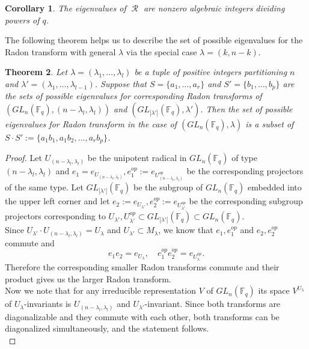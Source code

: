\documentclass[12pt,reqno]{amsart}
\newtheorem{thm}{Theorem}[section]
\newtheorem{cor}[thm]{Corollary}
\theoremstyle{definition}
\theoremstyle{remark}
\numberwithin{equation}{section}
\DeclareMathOperator{\R}{\mathcal{R}}
\begin{document}
\begin{cor}
    The eigenvalues of $\R$ are nonzero algebraic integers dividing powers of $q$.
\end{cor}

The following theorem helps us to describe the set of possible eigenvalues for the Radon transform with general $\lambda$ via the special case $\lambda=(k,n-k)$.\\

\begin{thm}\label{eigenvalues_box}
    Let $\lambda=(\lambda_1,\dots,\lambda_l)$ be a tuple of positive integers partitioning $n$ and $\lambda'=(\lambda_1,\dots,\lambda_{l-1})$. Suppose that $S=\{a_1,\dots, a_r\}$ and $S'=\{b_1,\dots, b_p\}$ are the sets of possible eigenvalues for corresponding Radon transforms of $(GL_{n}(\mathbb{F}_q),(n-\lambda_l,\lambda_l))$ and $(GL_{|\lambda'|}(\mathbb{F}_q), \lambda')$. Then the set of possible eigenvalues for Radon transform in the case of $(GL_{n}(\mathbb{F}_q),\lambda)$ is a subset of $S\cdot S':=\{a_1b_1, a_1b_2,\dots, a_rb_p\}$.
\end{thm}

\begin{proof}
    Let $U_{(n-\lambda_l,\lambda_l)}$ be the unipotent radical in $GL_{n}(\mathbb{F}_q)$ of type $(n-\lambda_l,\lambda_l)$ and $e_1=e_{U_{(n-\lambda_l,\lambda_l)}},e_1^{op}:=e_{U_{(n-\lambda_l,\lambda_l)}^{op}}$ be the corresponding projectors of the same type. Let $GL_{|\lambda'|}(\mathbb{F}_q)$ be the subgroup of $GL_n(\mathbb{F}_q)$ embedded into the upper left corner and let $e_2:=e_{U_{\lambda'}},e_2^{op}:=e_{U_{\lambda'}^{op}}$ be the corresponding subgroup projectors corresponding to $U_{\lambda'},U_{\lambda'}^{op}\subset GL_{|\lambda'|}(\mathbb{F}_q) \subset GL_{n}(\mathbb{F}_q)$.\\

    Since $U_{\lambda'}\cdot U_{(n-\lambda_l,\lambda_l)}=U_{\lambda}$ and $U_{\lambda'}\subset M_{\lambda}$, we know that $e_1,e_1^{op}$ and $e_2,e_2^{op}$ commute and
    \begin{equation}
        e_1 e_2=e_{U_{\lambda}}, \quad e_1^{op} e_2^{op}=e_{U_{\lambda}^{op}}.
    \end{equation}
    Therefore the corresponding smaller Radon transforms commute and their product gives us the larger Radon transform.\\

    Now we note that for any irreducible representation $V$ of $GL_n(\mathbb{F}_q)$ its space $V^{U_{\lambda}}$ of $U_{\lambda}$-invariants is $U_{(n-\lambda_l,\lambda_l)}$ and $U_{\lambda'}$-invariant. Since both transforms are diagonalizable and they commute with each other, both transforms can be diagonalized simultaneously, and the statement follows.\\
\end{proof}
\end{document}

